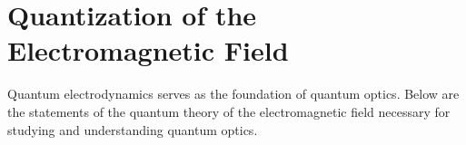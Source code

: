 \chapter{Quantization of the Electromagnetic Field} 
\label{chQuantel}

Quantum electrodynamics serves as the foundation of quantum optics. Below are the statements of the quantum theory of the electromagnetic field necessary for studying and understanding quantum optics.















